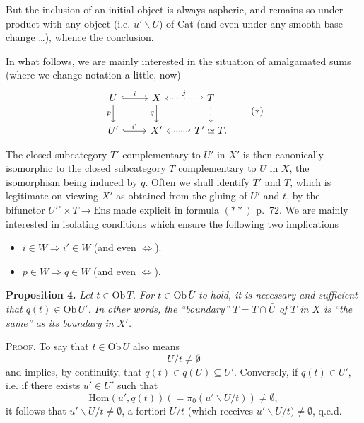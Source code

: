 \documentclass[11pt]{article}
\newcommand{\printedpage}[1]{\marginpar{\footnotesize p.~#1}}
\newcommand{\msp}[1]{\marginpar{\footnotesize [#1]}}
\newcommand{\Ob}{\mathrm{Ob}\,}
\newcommand{\Hom}{\mathrm{Hom}}
\begin{document}
\printedpage{53}

\msp{page 74}
But the inclusion of an initial object is always aspheric, and remains so under product with any object (i.e. $u'\backslash U$) of Cat (and even under any smooth base change \dots), whence the conclusion.

In what follows, we are mainly interested in the situation of amalgamated sums (where we change notation a little, now)
\[
\begin{tikzcd}
U \arrow[r, hook, "i"] \arrow[d, "p"'] & X \arrow[d, "q"'] & T \arrow[l, hook', dotted, "j"'] \arrow[d, dotted] \\
U' \arrow[r, hook, "i'"] & X' & T' \simeq T. \arrow[l, hook', dotted]
\end{tikzcd}
\tag*{$(*)$}
\]

The closed subcategory $T'$ complementary to $U'$ in $X'$ is then canonically isomorphic to the closed subcategory $T$ complementary to $U$ in $X$, the isomorphism being induced by $q$. Often we shall identify $T'$ and $T$, which is legitimate on viewing $X'$ as obtained from the gluing of $U'$ and $t$, by the bifunctor $U'^{\circ}\times T\longrightarrow \mathrm{Ens}$ made explicit in formula $(**)$ p.~72. We are mainly interested in isolating conditions which ensure the following two implications

\begin{itemize}
\item[a)] $i\in W\Longrightarrow i'\in W$ (and even $\Longleftrightarrow$).
\item[b)] $p\in W\Longrightarrow q\in W$ (and even $\Longleftrightarrow$).
\end{itemize}

\msp{page 75}
\textbf{Proposition 4.} \textit{Let $t\in\Ob T$. For $t\in\Ob\bar{U}$ to hold, it is necessary and sufficient that $q(t)\in\Ob\overline{U'}$. In other words, the ``boundary'' $\dot{T}=T\cap\bar{U}$ of $T$ in $X$ is ``the same'' as its boundary in $X'$.}

\textsc{Proof}. To say that $t\in\Ob\bar{U}$ also means
\[
U/t\neq\emptyset
\]
and implies, by continuity, that $q(t)\in\overline{q(U)}\subseteq\overline{U'}$. Conversely, if $q(t)\in\overline{U'}$, i.e. if there exists $u'\in U'$ such that
\[
\Hom(u',q(t))(=\pi_0(u'\backslash U/t))\neq\emptyset,
\]
it follows that $u'\backslash U/t\neq\emptyset$, a fortiori $U/t$ (which receives $u'\backslash U/t)\neq\emptyset$, q.e.d.
\end{document}
